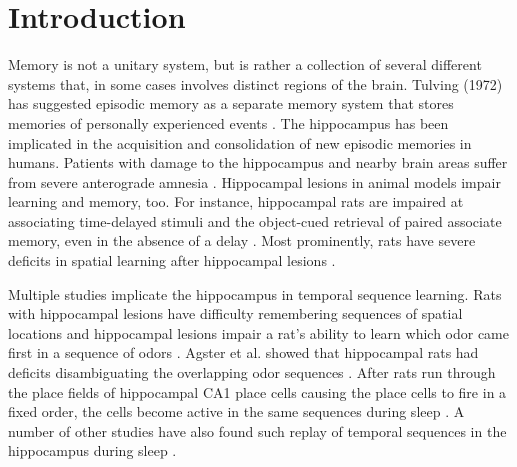 \documentclass[utf8]{frontiersSCNS} %
\begin{document}
\section{Introduction}
Memory is not a unitary system, but is rather a collection of several different systems that, in some cases involves distinct regions of the brain. Tulving (1972) has suggested episodic memory as a separate memory system that stores memories of personally experienced events \cite{tulving1972episodic}. The hippocampus has been implicated in the acquisition and consolidation of new episodic memories in humans. Patients with damage to the hippocampus and nearby brain areas suffer from severe anterograde amnesia \cite{scoville1957loss, milner1968further}. Hippocampal lesions in animal models impair learning and memory, too. For instance, hippocampal rats are impaired at associating time-delayed stimuli \cite{gluck2001gateway} and the object-cued retrieval of paired associate memory, even in the absence of a delay \cite{yoon2012hippocampus}. Most prominently, rats have severe deficits in spatial learning after hippocampal lesions \cite{morris1982place}.

Multiple studies implicate the hippocampus in temporal sequence learning. Rats with hippocampal lesions have difficulty remembering sequences of spatial locations \cite{chiba1994memory} and hippocampal lesions impair a rat's ability to learn which odor came first in a sequence of odors \cite{fortin2002critical}. Agster et al. showed that hippocampal rats had deficits disambiguating the overlapping odor sequences \cite{agster2002hippocampus}. After rats run through the place fields of hippocampal CA1 place cells causing the place cells to fire in a fixed order, the cells become active in the same sequences during sleep \cite{lee2002memory}. A number of other studies have also found such replay of temporal sequences in the hippocampus during sleep \cite{louie2001temporally, kudrimoti1999reactivation, qin1997memory, skaggs1996replay}.      

\end{document}
